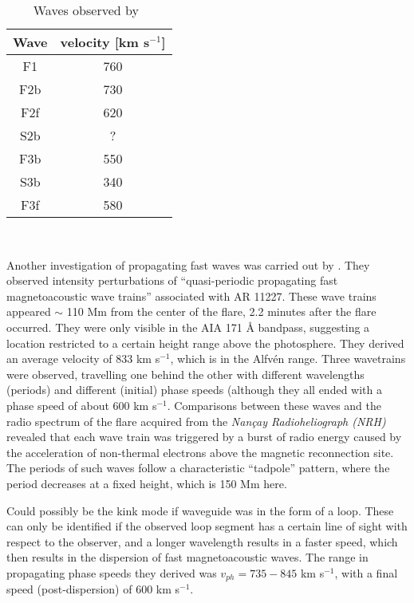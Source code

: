 \documentclass[preprint2]{aastex}
\begin{document}
\begin{table}[h]
    \centering
    \begin{tabular}{c c}
         \hline\hline
         Wave & velocity [km s$^{-1}$]\\
         \hline
         F1 & 760\\
         F2b & 730\\
         F2f & 620\\
         S2b & ?\\
         F3b & 550\\
         S3b & 340\\
         F3f & 580\\
         \hline
    \end{tabular}\\
    \caption{Waves observed by~\cite{pfw_1}}
    \label{table:lines}
\end{table}


Another investigation of propagating fast waves was carried out by
\cite{pfw_2}.
They observed intensity perturbations of ``quasi-periodic propagating fast
magnetoacoustic wave trains'' associated with AR 11227.
These wave trains appeared $\sim$ 110 Mm from the center of the flare,
2.2 minutes after the flare occurred.
They were only visible in the AIA 171 \AA{} bandpass, suggesting a
location restricted to a certain height range above the photosphere.
They derived an average velocity of
833 km s$^{-1}$, which is in the Alfv\'en range.
Three wavetrains were observed, travelling one behind the other
with different wavelengths (periods) and different (initial) phase
speeds (although they all ended with a phase speed of about 600 km s$^{-1}$.
Comparisons between these waves and the radio spectrum of the flare
acquired from the \emph{Nan\c{c}ay Radioheliograph (NRH)}
revealed that each wave train was triggered by a burst of radio energy
caused by the acceleration of non-thermal electrons above the
magnetic reconnection site. The periods of such waves follow a
characteristic ``tadpole'' pattern, where the period decreases at
a fixed height, which is 150 Mm here.

Could possibly be the kink mode if waveguide was in
the form of a loop. These can only be identified if the observed loop
segment has a certain line of sight with respect to the observer,
and a longer wavelength results in a faster speed, which then results
in the dispersion of fast magnetoacoustic waves. The range in
propagating phase speeds they derived was
$ v_{ph} = 735 - 845 $ km s$^{-1}$, with a final speed
(post-dispersion) of 600 km s$^{-1}$.
\end{document}

